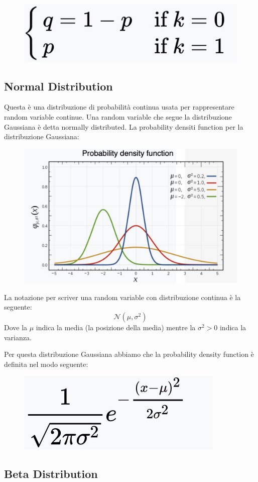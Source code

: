 \documentclass[14pt]{extreport}
\begin{document}
\begin{figure}[H]
\centering
\includegraphics[width=0.3\linewidth]{95.jpeg}
\end{figure}

\subsection{Normal Distribution}

Questa è una distribuzione di probabilità continua usata per rappresentare random variable continue. Una random variable che segue la distribuzione
Gaussiana è detta normally distributed. La probability densiti function per la distribuzione Gaussiana:

\begin{figure}[H]
\centering
\includegraphics[width=0.5\linewidth]{96.jpeg}
\end{figure}

La notazione per scriver una random variable con distribuzione continua è la seguente: $$\mathcal{N}(\mu, \sigma^2)$$ Dove la $\mu$ indica la media
(la posizione della media) mentre la $\sigma^2>0$ indica la varianza.

Per questa distribuzione Gaussiana abbiamo che la probability density function è definita nel modo seguente:

\begin{figure}[H]
\centering
\includegraphics[width=0.3\linewidth]{97.jpeg}
\end{figure} 

\subsection{Beta Distribution}
\end{document}
